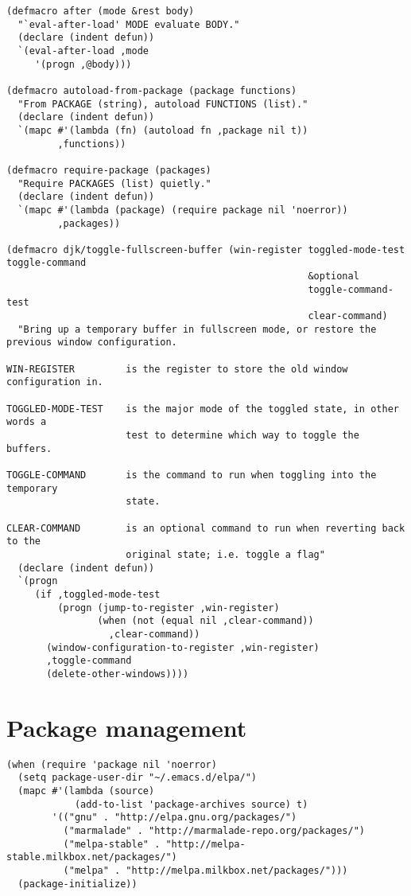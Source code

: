 \documentclass[11pt]{article}
\begin{document}
\begin{verbatim}
(defmacro after (mode &rest body)
  "`eval-after-load' MODE evaluate BODY."
  (declare (indent defun))
  `(eval-after-load ,mode
     '(progn ,@body)))

(defmacro autoload-from-package (package functions)
  "From PACKAGE (string), autoload FUNCTIONS (list)."
  (declare (indent defun))
  `(mapc #'(lambda (fn) (autoload fn ,package nil t))
         ,functions))

(defmacro require-package (packages)
  "Require PACKAGES (list) quietly."
  (declare (indent defun))
  `(mapc #'(lambda (package) (require package nil 'noerror))
         ,packages))

(defmacro djk/toggle-fullscreen-buffer (win-register toggled-mode-test toggle-command
                                                     &optional
                                                     toggle-command-test
                                                     clear-command)
  "Bring up a temporary buffer in fullscreen mode, or restore the
previous window configuration.

WIN-REGISTER         is the register to store the old window configuration in.

TOGGLED-MODE-TEST    is the major mode of the toggled state, in other words a
                     test to determine which way to toggle the buffers.

TOGGLE-COMMAND       is the command to run when toggling into the temporary
                     state.

CLEAR-COMMAND        is an optional command to run when reverting back to the
                     original state; i.e. toggle a flag"
  (declare (indent defun))
  `(progn
     (if ,toggled-mode-test
         (progn (jump-to-register ,win-register)
                (when (not (equal nil ,clear-command))
                  ,clear-command))
       (window-configuration-to-register ,win-register)
       ,toggle-command
       (delete-other-windows))))
\end{verbatim}
\section{Package management}
\label{sec-4}


\begin{verbatim}
(when (require 'package nil 'noerror)
  (setq package-user-dir "~/.emacs.d/elpa/")
  (mapc #'(lambda (source)
            (add-to-list 'package-archives source) t)
        '(("gnu" . "http://elpa.gnu.org/packages/")
          ("marmalade" . "http://marmalade-repo.org/packages/")
          ("melpa-stable" . "http://melpa-stable.milkbox.net/packages/")
          ("melpa" . "http://melpa.milkbox.net/packages/")))
  (package-initialize))
\end{verbatim}
\end{document}
